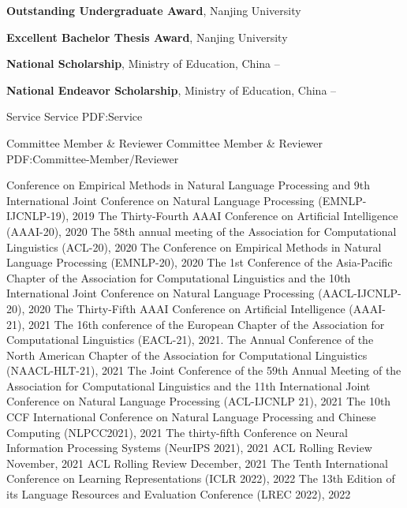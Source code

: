 \documentclass[letterpaper,MMMyyyy,nonstopmode]{simpleresumecv}
\begin{document}
\begin{Body}
\Gap
\Entry
\textbf{Outstanding Undergraduate Award}, Nanjing University
\hfill
{}

\Gap
\Entry
\textbf{Excellent Bachelor Thesis Award}, Nanjing University
\hfill
{}

\Gap
\Entry
\textbf{National Scholarship}, Ministry of Education, China
\hfill
{} -- 

\Gap
\Entry
\textbf{National Endeavor Scholarship}, Ministry of Education, China
\hfill
{} -- 

\Section
{Service}
{Service}
{PDF:Service}

\SubSection
{Committee Member \& Reviewer}
{Committee Member \& Reviewer}
{PDF:Committee-Member/Reviewer}

    \BulletItem Conference on Empirical Methods in Natural Language Processing and 9th International Joint Conference on Natural Language Processing (EMNLP-IJCNLP-19), 2019
    \BulletItem The Thirty-Fourth AAAI Conference on Artificial Intelligence (AAAI-20), 2020
    \BulletItem The 58th annual meeting of the Association for Computational Linguistics (ACL-20), 2020
    \BulletItem The Conference on Empirical Methods in Natural Language Processing (EMNLP-20), 2020
    \BulletItem The 1st Conference of the Asia-Pacific Chapter of the Association for Computational Linguistics and the 10th International Joint Conference on Natural Language Processing (AACL-IJCNLP-20), 2020
    \BulletItem The Thirty-Fifth AAAI Conference on Artificial Intelligence (AAAI-21), 2021
    \BulletItem The 16th conference of the European Chapter of the Association for Computational Linguistics (EACL-21), 2021. 
    \BulletItem The Annual Conference of the North American Chapter of the Association for Computational Linguistics (NAACL-HLT-21), 2021
    \BulletItem The Joint Conference of the 59th Annual Meeting of the Association for Computational Linguistics and the 11th International Joint Conference on Natural Language Processing (ACL-IJCNLP 21), 2021
    \BulletItem The 10th CCF International Conference on Natural Language Processing and Chinese Computing (NLPCC2021), 2021
    \BulletItem The thirty-fifth Conference on Neural Information Processing Systems (NeurIPS 2021), 2021
    \BulletItem ACL Rolling Review November, 2021
    \BulletItem ACL Rolling Review December, 2021
    \BulletItem The Tenth International Conference on Learning Representations (ICLR 2022), 2022
    \BulletItem The 13th Edition of its Language Resources and Evaluation Conference (LREC 2022), 2022

\end{Body}
\end{document}
